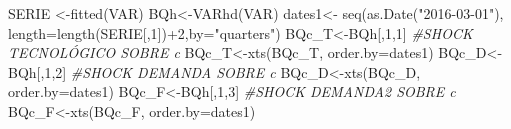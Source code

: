 \documentclass[
]{book}
\newenvironment{Shaded}{\begin{snugshade}}{\end{snugshade}}
\newcommand{\AttributeTok}[1]{\textcolor[rgb]{0.77,0.63,0.00}{#1}}
\newcommand{\CommentTok}[1]{\textcolor[rgb]{0.56,0.35,0.01}{\textit{#1}}}
\newcommand{\DecValTok}[1]{\textcolor[rgb]{0.00,0.00,0.81}{#1}}
\newcommand{\FunctionTok}[1]{\textcolor[rgb]{0.00,0.00,0.00}{#1}}
\newcommand{\NormalTok}[1]{#1}
\newcommand{\OtherTok}[1]{\textcolor[rgb]{0.56,0.35,0.01}{#1}}
\newcommand{\SpecialCharTok}[1]{\textcolor[rgb]{0.00,0.00,0.00}{#1}}
\newcommand{\StringTok}[1]{\textcolor[rgb]{0.31,0.60,0.02}{#1}}
\begin{document}
\begin{Shaded}
\begin{Highlighting}[]
\NormalTok{SERIE }\OtherTok{\textless{}{-}}\FunctionTok{fitted}\NormalTok{(VAR)}
\NormalTok{BQh}\OtherTok{\textless{}{-}}\FunctionTok{VARhd}\NormalTok{(VAR)}
\NormalTok{dates1}\OtherTok{\textless{}{-}} \FunctionTok{seq}\NormalTok{(}\FunctionTok{as.Date}\NormalTok{(}\StringTok{"2016{-}03{-}01"}\NormalTok{), }\AttributeTok{length=}\FunctionTok{length}\NormalTok{(SERIE[,}\DecValTok{1}\NormalTok{])}\SpecialCharTok{+}\DecValTok{2}\NormalTok{,}\AttributeTok{by=}\StringTok{"quarters"}\NormalTok{)}
\NormalTok{BQc\_T}\OtherTok{\textless{}{-}}\NormalTok{BQh[,}\DecValTok{1}\NormalTok{,}\DecValTok{1}\NormalTok{] }\CommentTok{\#SHOCK TECNOLÓGICO SOBRE c}
\NormalTok{BQc\_T}\OtherTok{\textless{}{-}}\FunctionTok{xts}\NormalTok{(BQc\_T, }\AttributeTok{order.by=}\NormalTok{dates1)}
\NormalTok{BQc\_D}\OtherTok{\textless{}{-}}\NormalTok{BQh[,}\DecValTok{1}\NormalTok{,}\DecValTok{2}\NormalTok{] }\CommentTok{\#SHOCK DEMANDA SOBRE c}
\NormalTok{BQc\_D}\OtherTok{\textless{}{-}}\FunctionTok{xts}\NormalTok{(BQc\_D, }\AttributeTok{order.by=}\NormalTok{dates1)}
\NormalTok{BQc\_F}\OtherTok{\textless{}{-}}\NormalTok{BQh[,}\DecValTok{1}\NormalTok{,}\DecValTok{3}\NormalTok{] }\CommentTok{\#SHOCK DEMANDA2 SOBRE c}
\NormalTok{BQc\_F}\OtherTok{\textless{}{-}}\FunctionTok{xts}\NormalTok{(BQc\_F, }\AttributeTok{order.by=}\NormalTok{dates1)}
\end{Highlighting}
\end{Shaded}


  
\end{document}
